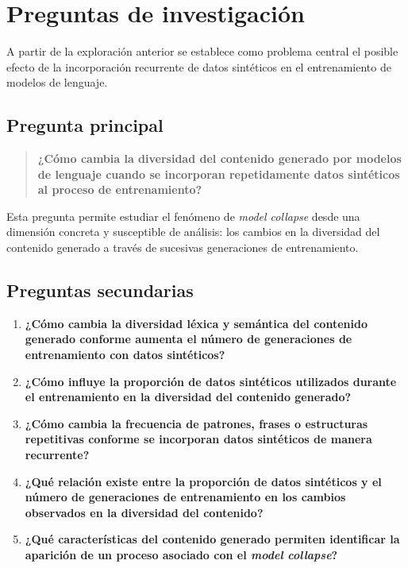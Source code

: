 \documentclass[12pt]{article}
\begin{document}
\section{Preguntas de investigación}

A partir de la exploración anterior se establece como problema central
el posible efecto de la incorporación recurrente de datos sintéticos en
el entrenamiento de modelos de lenguaje.

\subsection{Pregunta principal}

\begin{quote}
\textbf{¿Cómo cambia la diversidad del contenido generado por modelos
de lenguaje cuando se incorporan repetidamente datos sintéticos al
proceso de entrenamiento?}
\end{quote}

Esta pregunta permite estudiar el fenómeno de \textit{model collapse}
desde una dimensión concreta y susceptible de análisis: los cambios en
la diversidad del contenido generado a través de sucesivas generaciones
de entrenamiento.

\subsection{Preguntas secundarias}

\begin{enumerate}[label=\textbf{\arabic*.}]
    \item \textbf{¿Cómo cambia la diversidad léxica y semántica del
    contenido generado conforme aumenta el número de generaciones de
    entrenamiento con datos sintéticos?}

    \item \textbf{¿Cómo influye la proporción de datos sintéticos
    utilizados durante el entrenamiento en la diversidad del contenido
    generado?}

    \item \textbf{¿Cómo cambia la frecuencia de patrones, frases o
    estructuras repetitivas conforme se incorporan datos sintéticos de
    manera recurrente?}

    \item \textbf{¿Qué relación existe entre la proporción de datos
    sintéticos y el número de generaciones de entrenamiento en los
    cambios observados en la diversidad del contenido?}

    \item \textbf{¿Qué características del contenido generado permiten
    identificar la aparición de un proceso asociado con el
    \textit{model collapse}?}
\end{enumerate}
\end{document}
